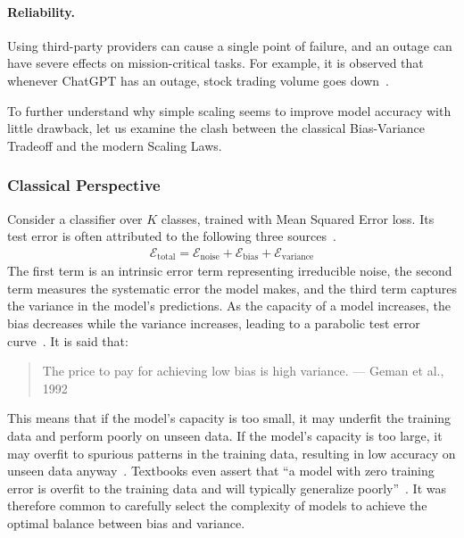 \documentclass[../main.tex]{subfiles}
\begin{document}
\paragraph{Reliability.} Using third-party providers can cause a single point of failure, and an outage can have severe effects on mission-critical tasks. For example, it is observed that whenever ChatGPT has an outage, stock trading volume goes down~\cite{chengDoesGenerativeAI2025}.

To further understand why simple scaling seems to improve model accuracy with little drawback, let us examine the clash between the classical Bias-Variance Tradeoff and the modern Scaling Laws.

\subsubsection{Classical Perspective}
Consider a classifier over $K$ classes, trained with Mean Squared Error loss. Its test error is often attributed to the following three sources~\cite{gemanNeuralNetworksBias1992}.
\begin{align}
    \mathcal{E}_\text{total} = \mathcal{E}_\text{noise} + \mathcal{E}_\text{bias} + \mathcal{E}_\text{variance}
\end{align}
The first term is an intrinsic error term representing irreducible noise, the second term measures the systematic error the model makes, and the third term captures the variance in the model's predictions. As the capacity of a model increases, the bias decreases while the variance increases, leading to a parabolic test error curve~\cite{nealModernTakeBiasVariance2019a}. It is said that:

\begin{quote}
    The price to pay for achieving low bias is high variance. --- Geman et al., 1992~\cite{gemanNeuralNetworksBias1992}
\end{quote}

This means that if the model's capacity is too small, it may underfit the training data and perform poorly on unseen data. If the model's capacity is too large, it may overfit to spurious patterns in the training data, resulting in low accuracy on unseen data anyway~\cite{belkinReconcilingModernMachine2019}. Textbooks even assert that ``a model with zero training error is overfit to the training data and will typically generalize poorly''~\cite[pg. 221]{hastieElementsStatisticalLearning2009}. It was therefore common to carefully select the complexity of models to achieve the optimal balance between bias and variance.
\end{document}
